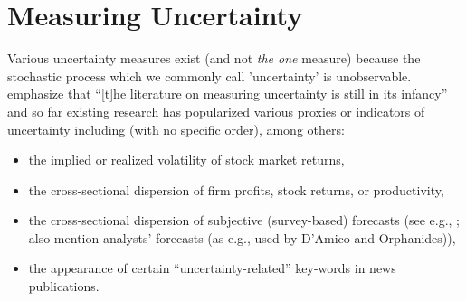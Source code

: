 \documentclass[a4paper,12pt,oneside,pointednumbers,bibtotoc,bigheadings,liststotoc]{scrbook}
\begin{document}
\section{Measuring Uncertainty}
Various uncertainty measures exist (and not \textit{the one} measure) because the stochastic process which we commonly call 'uncertainty' is unobservable. \citet[p. 1182]{juradoetal:15} emphasize that ``[t]he literature on measuring uncertainty is still in its infancy'' and so far existing research has popularized various proxies or indicators of uncertainty including (with no specific order), among others: 
\begin{itemize}
	\item the implied or realized volatility of stock market returns, 
	\item the cross-sectional dispersion of firm profits, stock returns, or productivity,
	\item the cross-sectional dispersion of subjective (survey-based) forecasts (see e.g., \citet{bachmannetal:13}; \citet{juradoetal:15} also mention analysts' forecasts (as e.g., used by D'Amico and Orphanides)),
	\item the appearance of certain ``uncertainty-related'' key-words in news publications.
\end{itemize}
\end{document}
